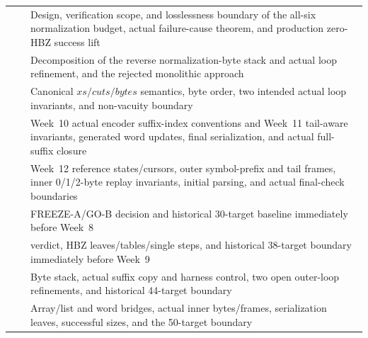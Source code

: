 \begin{longtable}{L{0.29\textwidth}L{0.31\textwidth}L{0.32\textwidth}}
\newline{} &
\newline{} & Design, verification scope, and losslessness boundary of the all-six normalization budget, actual failure-cause theorem, and production zero-HBZ success lift \\
 &  & Decomposition of the reverse normalization-byte stack and actual loop refinement, and the rejected monolithic approach \\
\newline{} &
\newline{} & Canonical \(xs/cuts/bytes\) semantics, byte order, two intended actual loop invariants, and non-vacuity boundary \\
\newline{} &
\newline{} & Week~10 actual encoder suffix-index conventions and Week~11 tail-aware invariants, generated word updates, final serialization, and actual full-suffix closure \\
\newline{} &
\newline{} & Week~12 reference states/cursors, outer symbol-prefix and tail frames, inner 0/1/2-byte replay invariants, initial parsing, and actual final-check boundaries \\
 &  & FREEZE-A/GO-B decision and historical 30-target baseline immediately before Week~8 \\
 &  &  verdict, HBZ leaves/tables/single steps, and historical 38-target boundary immediately before Week~9 \\
 &  & Byte stack, actual suffix copy and harness control, two open outer-loop refinements, and historical 44-target boundary \\
 &  & Array/list and word bridges, actual inner bytes/frames, serialization leaves, successful sizes, and the 50-target  boundary \\

\end{longtable}
